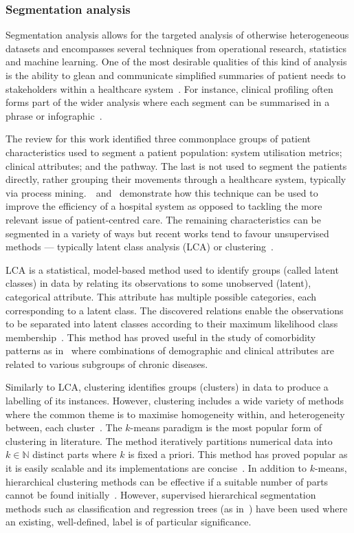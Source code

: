 \documentclass[11pt]{article}
\begin{document}
\subsubsection{Segmentation analysis}

Segmentation analysis allows for the targeted analysis of otherwise
heterogeneous datasets and encompasses several techniques from operational
research, statistics and machine learning. One of the most desirable qualities
of this kind of analysis is the ability to glean and communicate simplified
summaries of patient needs to stakeholders within a healthcare
system~\cite{Vuik2016b, Yoon2020}. For instance, clinical profiling often forms
part of the wider analysis where each segment can be summarised in a phrase or
infographic~\cite{Vuik2016a, Yan2019}.

The review for this work identified three commonplace groups of patient
characteristics used to segment a patient population: system utilisation
metrics; clinical attributes; and the pathway. The last is not used to segment
the patients directly, rather grouping their movements through a healthcare
system, typically via process mining.~\cite{Arnolds2018}~and~\cite{Delias2015}
demonstrate how this technique can be used to improve the efficiency of a
hospital system as opposed to tackling the more relevant issue of
patient-centred care. The remaining characteristics can be segmented in a
variety of ways but recent works tend to favour unsupervised methods ---
typically latent class analysis (LCA) or clustering~\cite{Yan2018}.

LCA is a statistical, model-based method used to identify groups (called latent
classes) in data by relating its observations to some unobserved (latent),
categorical attribute. This attribute has multiple possible categories, each
corresponding to a latent class. The discovered relations enable the
observations to be separated into latent classes according to their maximum
likelihood class membership~\cite{Hagenaars2002,Lazarsfeld1968}. This method has
proved useful in the study of comorbidity patterns as
in~\cite{Kuwornu2014,Larsen2017} where combinations of demographic and clinical
attributes are related to various subgroups of chronic diseases.

Similarly to LCA, clustering identifies groups (clusters) in data to produce a
labelling of its instances. However, clustering includes a wide variety of
methods where the common theme is to maximise homogeneity within, and
heterogeneity between, each cluster~\cite{Everitt2011}. The \(k\)-means paradigm
is the most popular form of clustering in literature. The method iteratively
partitions numerical data into \(k \in \mathbb{N}\) distinct parts where \(k\)
is fixed a priori. This method has proved popular as it is easily scalable and
its implementations are concise~\cite{Olafsson2008,Wu2009}. In addition to
\(k\)-means, hierarchical clustering methods can be effective if a suitable
number of parts cannot be found initially~\cite{Vuik2016a}. However, supervised
hierarchical segmentation methods such as classification and regression trees
(as in~\cite{Harper2006}) have been used where an existing, well-defined, label
is of particular significance.
\end{document}
